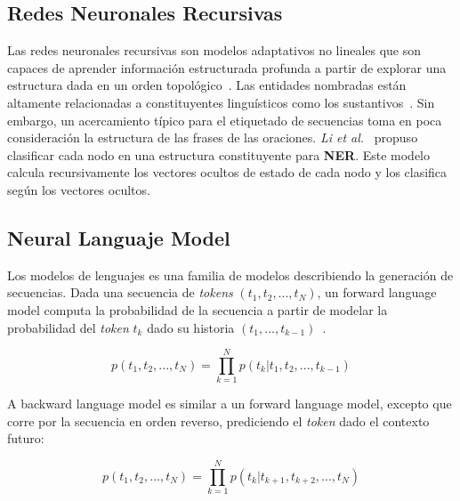\subsection{Redes Neuronales Recursivas}

Las redes neuronales recursivas son modelos adaptativos no lineales que son capaces de aprender informaci\'on estructurada profunda a partir de explorar una estructura dada en un orden topol\'ogico~\cite{li2018survey}. Las entidades nombradas est\'an altamente relacionadas a constituyentes lingu\'isticos como los sustantivos~\cite{li2017leveraging}. Sin embargo, un acercamiento t\'ipico para el etiquetado de secuencias toma en poca consideraci\'on la estructura de las frases de las oraciones. \emph{Li et al.}~\cite{li2017leveraging} propuso clasificar cada nodo en una estructura constituyente para \textbf{NER}. Este modelo calcula recursivamente los vectores ocultos de estado de cada nodo y los clasifica seg\'un los vectores ocultos.

\subsection{Neural Languaje Model}

Los modelos de lenguajes es una familia de modelos describiendo la generaci\'on de secuencias. Dada una secuencia de \emph{tokens} $(t_1, t_2, ..., t_N)$, un forward language model computa la probabilidad de la secuencia a partir de modelar la probabilidad del \emph{token} $t_k$ dado su historia $(t_1,...,t_{k-1})$~\cite{peters2017semi}.

\begin{equation}
	p(t_1, t_2, ..., t_N) = \prod_{k=1}^{N} p(t_k | t_1, t_2, ..., t_{k-1})
\end{equation}


A backward language model es similar a un forward language model, excepto que corre por la secuencia en orden reverso, prediciendo el \emph{token} dado el contexto futuro:

\begin{equation}
p(t_1, t_2, ..., t_N) = \prod_{k=1}^{N} p(t_k | t_{k + 1}, t_{k + 2}, ..., t_N)
\end{equation}

